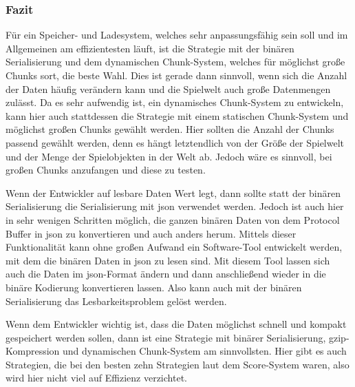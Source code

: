\subsubsection{Fazit}
Für ein Speicher- und Ladesystem, welches sehr anpassungsfähig sein soll und im Allgemeinen am effizientesten läuft, ist die Strategie mit der binären Serialisierung und dem dynamischen Chunk-System, welches für möglichst große Chunks sort, die beste Wahl. Dies ist gerade dann sinnvoll, wenn sich die Anzahl der Daten häufig verändern kann und die Spielwelt auch große Datenmengen zulässt. Da es sehr aufwendig ist, ein dynamisches Chunk-System zu entwickeln, kann hier auch stattdessen die Strategie mit einem statischen Chunk-System und möglichst großen Chunks gewählt werden. Hier sollten die Anzahl der Chunks passend gewählt werden, denn es hängt letztendlich von der Größe der Spielwelt und der Menge der Spielobjekten in der Welt ab. Jedoch wäre es sinnvoll, bei großen Chunks anzufangen und diese zu testen.    

Wenn der Entwickler auf lesbare Daten Wert legt, dann sollte statt der binären Serialisierung die Serialisierung mit \ac{json} verwendet werden. Jedoch ist auch hier in sehr wenigen Schritten möglich, die ganzen binären Daten von dem Protocol Buffer in \ac{json} zu konvertieren und auch anders herum.\cite{baeldungProtobufToJson} Mittels dieser Funktionalität kann ohne großen Aufwand ein Software-Tool entwickelt werden, mit dem die binären Daten in \ac{json} zu lesen sind. Mit diesem Tool lassen sich auch die Daten im \ac{json}-Format ändern und dann anschließend wieder in die binäre Kodierung konvertieren lassen. Also kann auch mit der binären Serialisierung das  Lesbarkeitsproblem gelöst werden.

Wenn dem Entwickler wichtig ist, dass die Daten möglichst schnell und kompakt gespeichert werden sollen, dann ist eine Strategie mit binärer Serialisierung, \ac{gzip}-Kompression und dynamischen Chunk-System am sinnvollsten. Hier gibt es auch Strategien, die bei den besten zehn Strategien laut dem Score-System waren, also wird hier nicht viel auf Effizienz verzichtet.